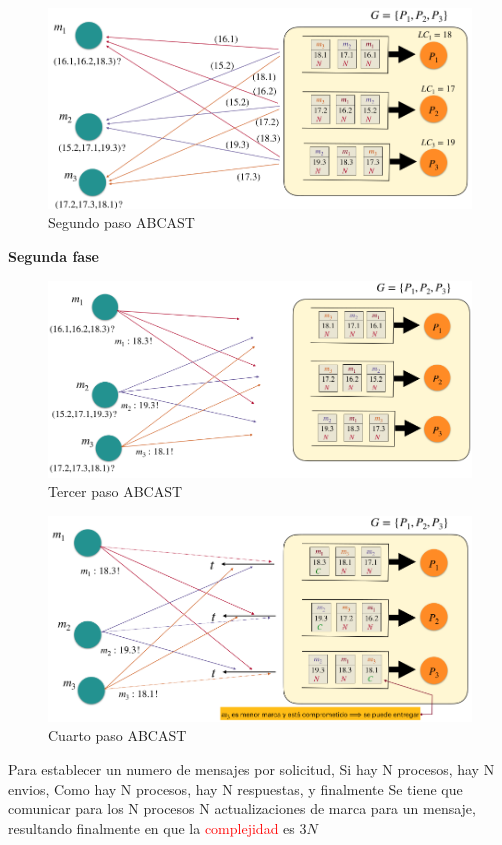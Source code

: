 \begin{figure}[H]
    \centering
    \includegraphics[width=0.7\linewidth]{img/Segundo_paso.png}
    \caption{Segundo paso ABCAST}\label{fig:1761653127112}
\end{figure}

\textbf{Segunda fase}

\begin{figure}[H]
    \centering
    \includegraphics[width=0.7\linewidth]{img/Tercer_paso.png}
    \caption{Tercer paso ABCAST}\label{fig:1761653161267}
\end{figure}

\begin{figure}[H]
    \centering
    \includegraphics[width=0.7\linewidth]{img/Cuarto_paso.png}
    \caption{Cuarto paso ABCAST}\label{fig:1761653182730}
\end{figure}

Para establecer un numero de mensajes por solicitud, Si hay N procesos, hay N envios, Como hay N procesos, hay N respuestas, y finalmente Se tiene que comunicar para los N procesos N actualizaciones de marca para un mensaje, resultando finalmente en que la \textcolor{red}{complejidad} es $3N$


